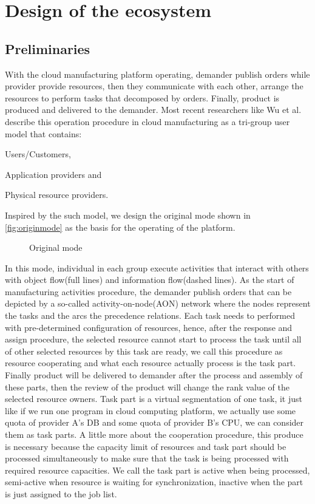 \section{Design of the ecosystem} %
\label{sec:design_of_the_ecosystem}
\subsection{Preliminaries} %
\label{sub:preliminaries}
With the cloud manufacturing platform operating, demander publish orders while provider provide resources, then they communicate with each other, arrange the resources to perform tasks that decomposed by orders. Finally, product is produced and delivered to the demander. Most recent researchers like Wu et al.\cite{Wu2013} describe this operation procedure in cloud manufacturing as a tri-group user model that contains:\begin{inparaenum}[1)]
\item Users/Customers,
\item Application providers and
\item Physical resource providers.
\end{inparaenum}
Inspired by the such model, we design the original mode shown in \autoref{fig:originmode} as the basis for the operating of the platform.
\begin{figure}[htbp]
    \centering
    \resizebox{0.9\textwidth}{!}{}
    \caption{Original mode}
    \label{fig:originmode}
\end{figure}
In this mode, individual in each group execute activities that interact with others with object flow(full lines) and information flow(dashed lines). As the start of manufacturing activities procedure, the demander publish orders that can be depicted by a so-called activity-on-node(AON) network where the nodes represent the tasks and the arcs the precedence relations. Each task needs to performed with pre-determined configuration of resources, hence, after the response and assign procedure, the selected resource cannot start to process the task until all of other selected resources by this task are ready, we call this procedure as resource cooperating and what each resource actually process is the task part. Finally product will be delivered to demander after the process and assembly of these parts, then the review of the product will change the rank value of the selected resource owners. Task part is a virtual segmentation of one task, it just like if we run one program in cloud computing platform, we actually use some quota of provider A's DB and some quota of provider B's CPU, we can consider them as task parts. A little more about the cooperation procedure, this produce is necessary because the capacity limit of resources and task part should be processed simultaneously to make sure that the task is being processed with required resource capacities. We call the task part is active when being processed, semi-active when resource is waiting for synchronization, inactive when the part is just assigned to the job list.

